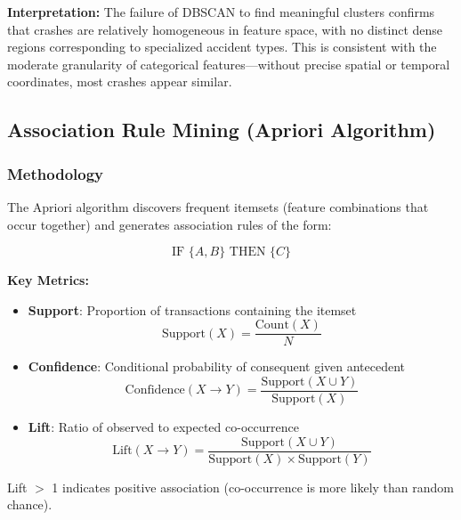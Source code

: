 \documentclass[12pt,man]{apa7}
\begin{document}
\textbf{Interpretation:} The failure of DBSCAN to find meaningful clusters confirms that crashes are relatively homogeneous in feature space, with no distinct dense regions corresponding to specialized accident types. This is consistent with the moderate granularity of categorical features—without precise spatial or temporal coordinates, most crashes appear similar.

\subsection{Association Rule Mining (Apriori Algorithm)}

\subsubsection{Methodology}

The Apriori algorithm discovers frequent itemsets (feature combinations that occur together) and generates association rules of the form:

\begin{equation}
\text{IF } \{A, B\} \text{ THEN } \{C\}
\end{equation}

\textbf{Key Metrics:}
\begin{itemize}
    \item \textbf{Support}: Proportion of transactions containing the itemset
    \begin{equation}
    \text{Support}(X) = \frac{\text{Count}(X)}{N}
    \end{equation}

    \item \textbf{Confidence}: Conditional probability of consequent given antecedent
    \begin{equation}
    \text{Confidence}(X \rightarrow Y) = \frac{\text{Support}(X \cup Y)}{\text{Support}(X)}
    \end{equation}

    \item \textbf{Lift}: Ratio of observed to expected co-occurrence
    \begin{equation}
    \text{Lift}(X \rightarrow Y) = \frac{\text{Support}(X \cup Y)}{\text{Support}(X) \times \text{Support}(Y)}
    \end{equation}
\end{itemize}

Lift $>$ 1 indicates positive association (co-occurrence is more likely than random chance).
\end{document}
